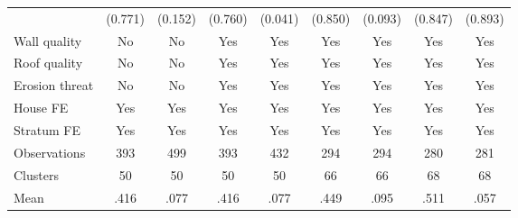 {\begin{tabular}{l*{8}{c}}
                &  (0.771)         &  (0.152)         &  (0.760)         &  (0.041)         &  (0.850)         &  (0.093)         &  (0.847)         &  (0.893)         \\
Wall quality    &       No         &       No         &      Yes         &      Yes         &      Yes         &      Yes         &      Yes         &      Yes         \\
Roof quality    &       No         &       No         &      Yes         &      Yes         &      Yes         &      Yes         &      Yes         &      Yes         \\
Erosion threat  &       No         &       No         &      Yes         &      Yes         &      Yes         &      Yes         &      Yes         &      Yes         \\
House FE        &      Yes         &      Yes         &      Yes         &      Yes         &      Yes         &      Yes         &      Yes         &      Yes         \\
Stratum FE      &      Yes         &      Yes         &      Yes         &      Yes         &      Yes         &      Yes         &      Yes         &      Yes         \\
\hline
Observations    &      393         &      499         &      393         &      432         &      294         &      294         &      280         &      281         \\
Clusters        &       50         &       50         &       50         &       50         &       66         &       66         &       68         &       68         \\
Mean            &     .416         &     .077         &     .416         &     .077         &     .449         &     .095         &     .511         &     .057         \\
\hline\hline
\end{tabular}
}
